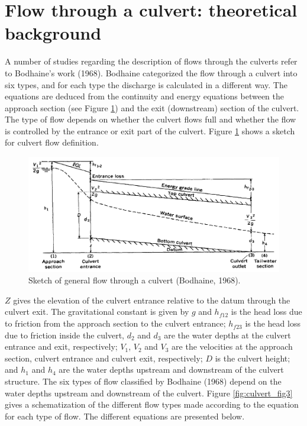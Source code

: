 \section{Flow through a culvert: theoretical background}

A number of studies regarding the description of flows through the culverts 
refer to Bodhaine's work (1968). 
Bodhaine categorized the flow through a culvert into six types, and for each type 
the discharge is calculated in a different way. 
The equations are deduced from the continuity and energy equations between the approach 
section (see Figure \ref{fig:culvert_fig2}) and the exit (downstream) section of the culvert. 
The type of flow depends on whether the culvert flows full and whether the flow is controlled 
by the entrance or exit part of the culvert. Figure \ref{fig:culvert_fig2} 
shows a sketch for culvert flow definition. 

\begin{figure}[H]
\begin{center}
  \includegraphics[scale=1]{culvert_fig2.png}
\end{center}
\caption{Sketch of general flow through a culvert (Bodhaine, 1968).}
\label{fig:culvert_fig2}
\end{figure}

$Z$ gives the elevation of the culvert entrance relative to the datum through the culvert exit. 
The gravitational constant is given by $g$ and $h_{f12}$ is the head loss due to friction from 
the approach section to the culvert entrance; 
$h_{f23}$ is the head loss due to friction inside the culvert, $d_2$ and $d_3$ are the water 
depths at the culvert entrance and exit, respectively; 
$V_1$, $V_2$ and $V_3$ are the velocities at the approach section, 
culvert entrance and culvert exit, respectively; 
$D$ is the culvert height; 
and $h_1$ and $h_4$ are the water depths upstream and downstream of the culvert structure.
The six types of flow classified by Bodhaine (1968) depend on the water depths 
upstream and downstream of the culvert. 
Figure \ref{fig:culvert_fig3} gives a schematization of the different flow types 
made according to the equation for each type of flow. 
The different equations are presented below.

